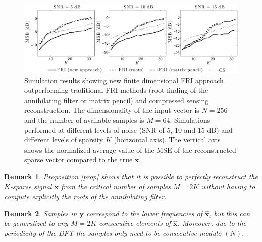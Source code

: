 \documentclass{article}
\def\x{{\bm x}}
\def\bhx{\bm{\hat{x}}}
\def\y{{\bm y}}
\newtheorem{remark}{Remark}
\begin{document}
\begin{figure}[t]
\centering
\includegraphics[width=.8\textwidth]{figures/simulation_results_dB}
\caption{Simulation results showing new finite dimensional FRI approach outperforming
traditional FRI methods (root finding of the annihilating filter or matrix pencil) 
and compressed sensing reconstruction. The dimensionality
of the input vector is $N=256$ and the number of available samples is $M=64$. Simulations performed at 
different levels of noise (SNR of 5, 10 and 15 dB) and different levels of sparsity $K$ (horizontal axis).
The vertical axis shows the normalized average value of the MSE of the reconstructed
sparse vector compared to the true $\x$.}
\label{fig:results}
\end{figure}

\begin{remark}
Proposition \eqref{prop} shows that it is possible to perfectly reconstruct the $K$-sparse
signal $\x$ from the critical number of samples $M=2K$ without having to compute explicitly 
the roots of the annihilating filter. 
\end{remark}

\begin{remark}
Samples in $\y$ correspond to the lower frequencies of $\bhx$, but this can be generalized 
to any $M=2K$ consecutive elements of $\bhx$. Moreover,
due to the periodicity of the DFT the samples only need to be consecutive modulo $(N)$.
\end{remark}
\end{document}
